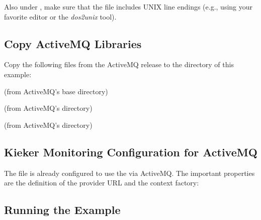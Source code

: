 \noindent Also under \UnixLikeSystems{}, make sure that the file  %
includes UNIX line endings (e.g., using your favorite editor or the \textit{dos2unix} tool).

\subsection{Copy ActiveMQ Libraries}

Copy the following files from the ActiveMQ release to the %
 directory of this example:

\medskip

\enlargethispage{0.5cm}

\begin{compactenum}
\item {} (from ActiveMQ's base directory)
\item {} (from ActiveMQ's  directory)
\item {} (from ActiveMQ's  directory)
\end{compactenum}

\subsection{Kieker Monitoring Configuration for ActiveMQ}

The file  %
is already configured to use the  via ActiveMQ. The important properties are %
the definition of the provider URL and the context factory:

\setPropertiesListing


\setPropertiesListing


\subsection{Running the Example}

